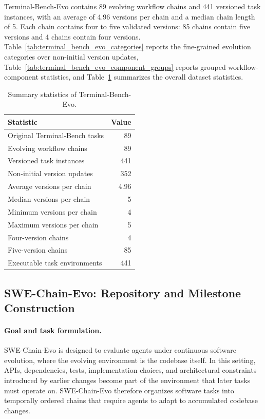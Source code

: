 \documentclass{article}
\begin{document}
Terminal-Bench-Evo contains 89 evolving workflow chains and 441 versioned task instances, with an average of 4.96 versions per chain and a median chain length of 5. Each chain contains four to five validated versions: 85 chains contain five versions and 4 chains contain four versions. Table~\ref{tab:terminal_bench_evo_categories} reports the fine-grained evolution categories over non-initial version updates, Table~\ref{tab:terminal_bench_evo_component_groups} reports grouped workflow-component statistics, and Table~\ref{tab:terminal_bench_evo_statistics} summarizes the overall dataset statistics.


\begin{table}[t]
\centering
\small
\begin{tabular}{lr}
\toprule
\textbf{Statistic} & \textbf{Value} \\
\midrule
Original Terminal-Bench tasks & 89 \\
Evolving workflow chains & 89 \\
Versioned task instances & 441 \\
Non-initial version updates & 352 \\
Average versions per chain & 4.96 \\
Median versions per chain & 5 \\
Minimum versions per chain & 4 \\
Maximum versions per chain & 5 \\
Four-version chains & 4 \\
Five-version chains & 85 \\
Executable task environments & 441 \\
\bottomrule
\end{tabular}
\caption{Summary statistics of Terminal-Bench-Evo.}
\label{tab:terminal_bench_evo_statistics}
\end{table}








\subsection{SWE-Chain-Evo: Repository and Milestone Construction}
\label{app:swe}
\label{app:swe_milestone}

\paragraph{Goal and task formulation.}
SWE-Chain-Evo is designed to evaluate agents under continuous software evolution, where the evolving environment is the codebase itself. In this setting, APIs, dependencies, tests, implementation choices, and architectural constraints introduced by earlier changes become part of the environment that later tasks must operate on. SWE-Chain-Evo therefore organizes software tasks into temporally ordered chains that require agents to adapt to accumulated codebase changes.
\end{document}

